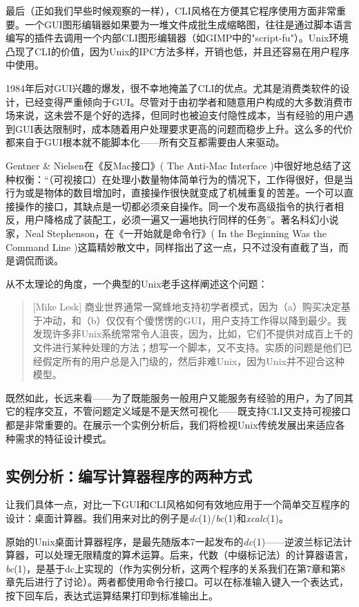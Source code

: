 \documentclass[12pt,oneside]{book}
\begin{document}
\begin{common-format}
最后（正如我们早些时候观察的一样），CLI风格在方便其它程序使用方面非常重要。一个GUI图形编辑器如果要为一堆文件成批生成缩略图，往往是通过脚本语言编写的插件去调用一个内部CLI图形编辑器（如GIMP中的"script-fu"）。Unix环境凸现了CLI的价值，因为Unix的IPC方法多样，开销也低，并且还容易在用户程序中使用。

1984年后对GUI兴趣的爆发，很不幸地掩盖了CLI的优点。尤其是消费类软件的设计，已经变得严重倾向于GUI。尽管对于由初学者和随意用户构成的大多数消费市场来说，这未尝不是个好的选择，但同时也被迫支付隐性成本，当有经验的用户遇到GUI表达限制时，成本随着用户处理要求更高的问题而稳步上升。这么多的代价都来自于GUI根本就不能脚本化——所有交互都需要由人来驱动。

Gentner \&{} Nielsen在《反Mac接口》( The Anti-Mac Interface )\cite{Gentner-Nielsen}中很好地总结了这种权衡：“（可视接口）在处理小数量物体简单行为的情况下，工作得很好，但是当行为或是物体的数目增加时，直接操作很快就变成了机械重复的苦差。一个可以直接操作的接口，其缺点是一切都必须亲自操作。同一个发布高级指令的执行者相反，用户降格成了装配工，必须一遍又一遍地执行同样的任务”。著名科幻小说家，Neal Stephenson，在《一开始就是命令行》( In the Beginning Was the Command Line \cite{Stephenson} )这篇精妙散文中，同样指出了这一点，只不过没有直截了当，而是调侃而谈。

从不太理论的角度，一个典型的Unix老手这样阐述这个问题：
\begin{quote}[Mike Lesk]
商业世界通常一窝蜂地支持初学者模式，因为（a）购买决定基于冲动，和（b）仅仅有个傻愣愣的GUI，用户支持工作得以降到最少。我发现许多非Unix系统常常令人沮丧，因为，比如，它们不提供对成百上千的文件进行某种处理的方法；想写一个脚本，又不支持。实质的问题是他们已经假定所有的用户总是入门级的，然后非难Unix，因为Unix并不迎合这种模型。
\end{quote}

既然如此，长远来看——为了既能服务一般用户又能服务有经验的用户，为了同其它的程序交互，不管问题定义域是不是天然可视化——既支持CLI又支持可视接口都是非常重要的。在展示一个实例分析后，我们将检视Unix传统发展出来适应各种需求的特征设计模式。

\subsection{实例分析：编写计算器程序的两种方式}
让我们具体一点，对比一下GUI和CLI风格如何有效地应用于一个简单交互程序的设计：桌面计算器。我们用来对比的例子是\textit{dc}(1)/\textit{bc}(1)和\textit{xcalc}(1)。

原始的Unix桌面计算器程序，是最先随版本7一起发布的\textit{dc}(1)——逆波兰标记法计算器，可以处理无限精度的算术运算。后来，代数（中缀标记法）的计算器语言，\textit{bc}(1)，是基于dc上实现的（作为实例分析，这两个程序的关系我们在第7章和第8章先后进行了讨论）。两者都使用命令行接口。可以在标准输入键入一个表达式，按下回车后，表达式运算结果打印到标准输出上。


\end{common-format}
\end{document}
